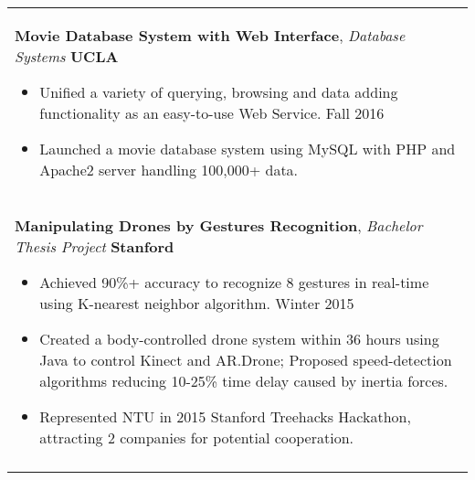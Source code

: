 \documentclass[a4paper,11pt]{article} %
\begin{document}
{\begin{tabular}{p{18.5cm}}
{\bf{Movie Database System with Web Interface}}, {\it{Database Systems}} \hfill {\bf{UCLA}}
\begin{itemize}
\item Unified a variety of querying, browsing and data adding functionality as an easy-to-use Web Service. \hfill Fall 2016
\item Launched a movie database system using MySQL with PHP and Apache2 server handling 100,000+ data.\vspace*{-\baselineskip}
\end{itemize} \\
\vspace{.1mm}

{\bf{Manipulating Drones by Gestures Recognition}}, {\it{Bachelor Thesis Project}} \hfill {\bf{Stanford}}
\begin{itemize}%
\item Achieved 90\%+ accuracy to recognize 8 gestures in real-time using K-nearest neighbor algorithm. \hfill Winter 2015 
\item Created a body-controlled drone system within 36 hours using Java to control Kinect and AR.Drone; Proposed speed-detection algorithms reducing 10-25\% time delay caused by inertia forces.  
\item Represented NTU in 2015 Stanford Treehacks Hackathon, attracting 2 companies for potential cooperation. \vspace*{-\baselineskip}
\end{itemize}\\
\vspace{.1mm}


\end{tabular}}
\end{document}
